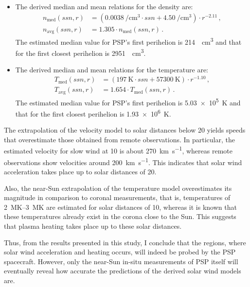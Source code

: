 \begin{itemize}
	\item The derived median and mean relations for the density are:
	\begin{align*}
		n_\text{med}(ssn,r) &= \left(\SI{0.0038}{\per\cm\cubed} \cdot ssn + \SI{4.50}{\per\cm\cubed}\right) \cdot r^{-2.11}	\,,\\
		n_\text{avg}(ssn,r) &= 1.305 \cdot n_\text{med}(ssn,r)	\,.
	\end{align*}
	 The estimated median value for PSP's first perihelion is \SI{214}{\per\cm\cubed} and that for the first closest perihelion is \SI{2951}{\per\cm\cubed}.
	
	\item The derived median and mean relations for the temperature are:
	\begin{align*}
		T_\text{med}(ssn,r) &= (\SI{197}{\K} \cdot ssn + \SI{57300}{\K}) \cdot r^{-1.10}	\,,\\
		T_\text{avg}(ssn,r) &= 1.654 \cdot T_\text{med}(ssn,r)\,.
	\end{align*}
	 The estimated median value for PSP's first perihelion is \SI{5.03e5}{\kelvin} and that for the first closest perihelion is \SI{1.93e6}{\kelvin}.
\end{itemize}

\medskip

The extrapolation of the velocity model to solar distances below \SI{20}{\Rs} yields speeds that overestimate those obtained from remote observations. In particular, the estimated velocity for slow wind at \SI{10}{\Rs} is about \SI{270}{\km\per\s}, whereas remote observations show velocities around \SI{200}{\km\per\s}. This indicates that solar wind acceleration takes place up to solar distances of \SI{20}{\Rs}.

Also, the near-Sun extrapolation of the temperature model overestimates its magnitude in comparison to coronal measurements, that is, temperatures of \SIrange{2}{3}{\mega\kelvin} are estimated for solar distances of \SI{10}{\Rs}, whereas it is known that these temperatures already exist in the corona close to the Sun. This suggests that plasma heating takes place up to these solar distances.

Thus, from the results presented in this study, I conclude that the regions, where solar wind acceleration and heating occurs, will indeed be probed by the PSP spacecraft. However, only the near-Sun in-situ measurements of PSP itself will eventually reveal how accurate the predictions of the derived solar wind models are.

